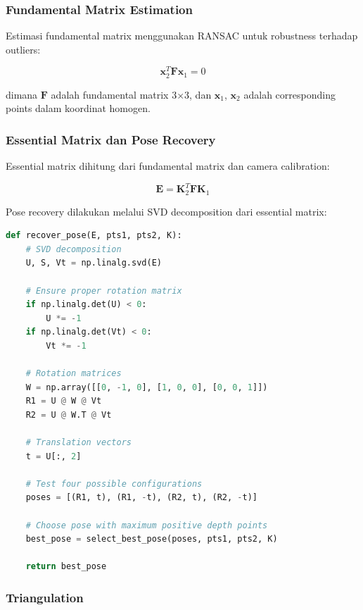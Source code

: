 \documentclass[12pt,a4paper]{article}
\begin{document}
\subsubsection{Fundamental Matrix Estimation}

Estimasi fundamental matrix menggunakan RANSAC untuk robustness terhadap outliers:

\begin{equation}
\mathbf{x}_2^T \mathbf{F} \mathbf{x}_1 = 0
\end{equation}

dimana $\mathbf{F}$ adalah fundamental matrix 3×3, dan $\mathbf{x}_1$, $\mathbf{x}_2$ adalah corresponding points dalam koordinat homogen.

\subsubsection{Essential Matrix dan Pose Recovery}

Essential matrix dihitung dari fundamental matrix dan camera calibration:

\begin{equation}
\mathbf{E} = \mathbf{K}_2^T \mathbf{F} \mathbf{K}_1
\end{equation}

Pose recovery dilakukan melalui SVD decomposition dari essential matrix:

\begin{lstlisting}[language=Python, caption=Pose Recovery from Essential Matrix]
def recover_pose(E, pts1, pts2, K):
    # SVD decomposition
    U, S, Vt = np.linalg.svd(E)
    
    # Ensure proper rotation matrix
    if np.linalg.det(U) < 0:
        U *= -1
    if np.linalg.det(Vt) < 0:
        Vt *= -1
    
    # Rotation matrices
    W = np.array([[0, -1, 0], [1, 0, 0], [0, 0, 1]])
    R1 = U @ W @ Vt
    R2 = U @ W.T @ Vt
    
    # Translation vectors
    t = U[:, 2]
    
    # Test four possible configurations
    poses = [(R1, t), (R1, -t), (R2, t), (R2, -t)]
    
    # Choose pose with maximum positive depth points
    best_pose = select_best_pose(poses, pts1, pts2, K)
    
    return best_pose
\end{lstlisting}

\subsubsection{Triangulation}
\end{document}

